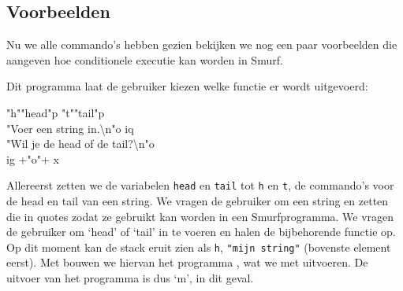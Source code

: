 \subsection{Voorbeelden}
\label{sec:intro:exmp}
Nu we alle commando's hebben gezien bekijken we nog een paar voorbeelden die
aangeven hoe conditionele executie kan worden in Smurf.

%
%

\begin{exmp}
	Dit programma laat de gebruiker kiezen welke functie er wordt uitgevoerd:
	\begin{smurf}
		"h""head"p "t""tail"p \\
		"Voer een string in.\textbackslash{}n"o iq \\
		"Wil je de head of de tail?\textbackslash{}n"o \\
		ig +"o"+ x
	\end{smurf}
	Allereerst zetten we de variabelen \verb$head$ en \verb$tail$ tot \verb$h$ en
	\verb$t$, de commando's voor de head en tail van een string. We vragen de
	gebruiker om een string en zetten die in quotes zodat ze gebruikt kan worden
	in een Smurfprogramma. We vragen de gebruiker om `head' of `tail' in te
	voeren en halen de bijbehorende functie op. Op dit moment kan de stack eruit
	zien als \verb$h$, \verb$"mijn string"$ (bovenste element eerst). Met
	 bouwen we hiervan het programma , wat we met  uitvoeren. De uitvoer van het
	programma is dus `m', in dit geval.
\end{exmp}

